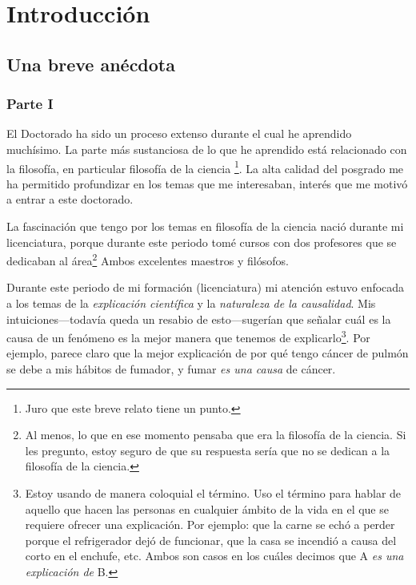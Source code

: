 
\chapter*{Introducción}\label{ch:introduction}

\section*{Una breve anécdota}

\subsection{Parte I}


\noindent El Doctorado ha sido un proceso extenso
durante el cual he aprendido muchísimo. La parte más
sustanciosa de lo que he aprendido está relacionado
con la filosofía, en particular filosofía de la ciencia
\footnote{
	Juro que este breve relato tiene un punto.
}.
La alta calidad del posgrado me ha permitido
profundizar en los temas que me interesaban, interés
que me motivó a entrar a este doctorado.

La fascinación que tengo por los temas en filosofía de
la ciencia nació durante mi licenciatura, porque
durante este periodo tomé cursos con dos profesores
que se dedicaban al área\footnote{
	Al menos, lo que en ese momento pensaba que era la
	filosofía de la	ciencia. Si les pregunto, estoy
	seguro de que su respuesta sería que no se dedican
	a la filosofía de la ciencia.
}
Ambos excelentes maestros y filósofos.

Durante este periodo de mi formación (licenciatura) mi
atención estuvo enfocada a los temas de la \emph{explicación
científica} y la \emph{naturaleza de la causalidad}. Mis
intuiciones---todavía queda un resabio de esto---sugerían
que señalar cuál es la causa de un fenómeno es la mejor
manera que tenemos de
explicarlo\footnote{
	Estoy usando de manera coloquial el término. Uso el
	término para hablar de aquello que hacen las
	personas en cualquier ámbito de la vida en el que se
	requiere ofrecer una explicación. Por ejemplo: que la
	carne se echó a perder porque el refrigerador
	dejó de funcionar, que la casa se incendió a causa
	del corto en el enchufe, etc. Ambos son casos en los
	cuáles decimos que A \emph{es una explicación de} B.
}.
Por ejemplo, parece claro que la mejor explicación de
por qué tengo cáncer de pulmón se debe a mis hábitos
de fumador, y fumar \emph{es una causa} de cáncer.

